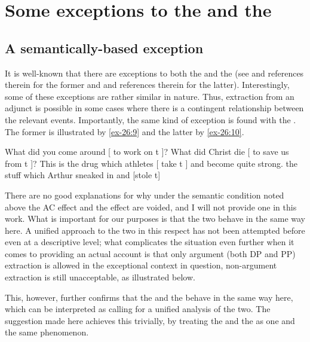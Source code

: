\documentclass[output=paper]{langsci/langscibook}
\begin{document}
\section{Some exceptions to the  and the }

\subsection{A semantically-based exception}

It is well-known that there are exceptions to both the  and the 
(see \citealt{Truswell2011} and references therein for the former and
\citealt{Postal1998} and
references therein for the latter). Interestingly, some of these exceptions are
rather similar in nature. Thus, extraction from an adjunct is possible in some
cases where there is a contingent relationship between the relevant events.
Importantly, the same kind of exception is found with the . The former is
illustrated by \eqref{ex-26:9} and the latter by \eqref{ex-26:10}.\largerpage[2]

\ea\label{ex-26:9}
	\ea What did you come around [ to work on t ]?
	\ex What did Christ die [ to save us from t ]?%
        \hfill\parencite[131]{Truswell2011}
	\z
\ex\label{ex-26:10}
	\ea This is the drug which athletes [ take t ] and become quite strong.
	\ex the stuff which Arthur sneaked in and [stole t]%
        \hfill\parencite[53]{Postal1998}
	\z
\z

There are no good explanations for why under the semantic condition noted above
the \glsdesc{AC} effect and the  effect are voided,
and I will not provide one in this work. What is important for our purposes is
that the two behave in the same way here. A unified approach to the two in this
respect has not been attempted before even at a descriptive level; what
complicates the situation even further when it comes to providing an actual
account is that only argument (both DP and PP) extraction is allowed in the
exceptional context in question, non-argument extraction is still unacceptable,
as illustrated below.

\z

This, however, further confirms that the  and the  behave in
the same way here, which can be interpreted as calling for a unified analysis
of the two. The suggestion made here achieves this trivially, by treating the
 and the  as one and the same phenomenon.
\end{document}
